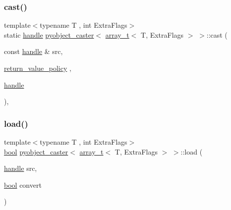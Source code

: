 \subsubsection{\texorpdfstring{cast()}{cast()}}
{\footnotesize\ttfamily template$<$typename T , int Extra\+Flags$>$ \\
static \mbox{\hyperlink{classhandle}{handle}} \mbox{\hyperlink{structpyobject__caster}{pyobject\+\_\+caster}}$<$ \mbox{\hyperlink{classarray__t}{array\+\_\+t}}$<$ T, Extra\+Flags $>$ $>$\+::cast (\begin{DoxyParamCaption}\item[{const \mbox{\hyperlink{classhandle}{handle}} \&}]{src,  }\item[{\mbox{\hyperlink{detail_2common_8h_adde72ab1fb0dd4b48a5232c349a53841}{return\+\_\+value\+\_\+policy}}}]{,  }\item[{\mbox{\hyperlink{classhandle}{handle}}}]{ }\end{DoxyParamCaption})\hspace{0.3cm}{\ttfamily [inline]}, {\ttfamily [static]}}

\mbox{\label{structpyobject__caster_3_01array__t_3_01_t_00_01_extra_flags_01_4_01_4_af469a144594ab1c83932bccc33f4daf9}} 
\subsubsection{\texorpdfstring{load()}{load()}}
{\footnotesize\ttfamily template$<$typename T , int Extra\+Flags$>$ \\
\mbox{\hyperlink{asdl_8h_af6a258d8f3ee5206d682d799316314b1}{bool}} \mbox{\hyperlink{structpyobject__caster}{pyobject\+\_\+caster}}$<$ \mbox{\hyperlink{classarray__t}{array\+\_\+t}}$<$ T, Extra\+Flags $>$ $>$\+::load (\begin{DoxyParamCaption}\item[{\mbox{\hyperlink{classhandle}{handle}}}]{src,  }\item[{\mbox{\hyperlink{asdl_8h_af6a258d8f3ee5206d682d799316314b1}{bool}}}]{convert }\end{DoxyParamCaption})\hspace{0.3cm}{\ttfamily [inline]}}

